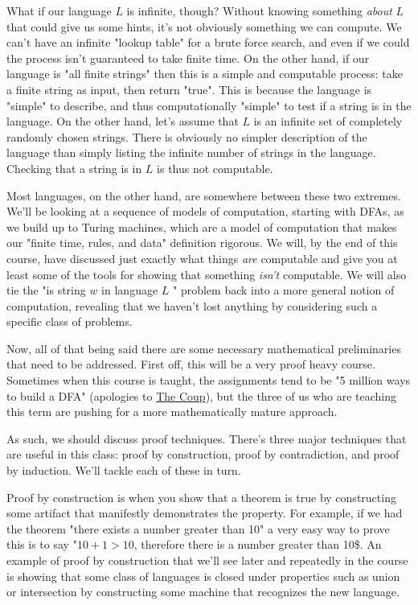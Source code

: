 \documentclass[11pt]{article}
\begin{document}
What if our language $L$ is infinite, though? Without knowing something \emph{about} $L$ that could give us some hints, it's not obviously something we can compute. We can't have an infinite "lookup table" for a brute force search, and even if we could the process isn't guaranteed to take finite time. On the other hand, if our language is "all finite strings" then this is a simple and computable process: take a finite string as input, then return "true". This is because the language is "simple" to describe, and thus computationally "simple" to test if a string is in the language. On the other hand, let's assume that $L$ is an infinite set of completely randomly chosen strings. There is obviously no simpler description of the language than simply listing the infinite number of strings in the language. Checking that a string is in $L$ is thus not computable.

Most languages, on the other hand, are somewhere between these two extremes. We'll be looking at a sequence of models of computation, starting with DFAs, as we build up to Turing machines, which are a model of computation that makes our "finite time, rules, and data" definition rigorous. We will, by the end of this course, have discussed just exactly what things \emph{are} computable and give you at least some of the tools for showing that something \emph{isn't} computable. We will also tie the "is string $w$ in language $L$ " problem back into a more general notion of computation, revealing that we haven't lost anything by considering such a specific class of problems.

Now, all of that being said there are some necessary mathematical preliminaries that need to be addressed. First off, this will be a very proof heavy course. Sometimes when this course is taught, the assignments tend to be "5 million ways to build a DFA" (apologies to \href{https://www.youtube.com/watch?v=RQthFDpYCys}{The Coup}), but the three of us who are teaching this term are pushing for a more mathematically mature approach. 

As such, we should discuss proof techniques. There's three major techniques that are useful in this class: proof by construction, proof by contradiction, and proof by induction. We'll tackle each of these in turn. 

Proof by construction is when you show that a theorem is true by constructing some artifact that manifestly demonstrates the property. For example, if we had the theorem "there exists a number greater than 10" a very easy way to prove this is to say "$10+1 > 10$, therefore there is a number greater than 10\$. An example of proof by construction that we'll see later and repeatedly in the course is showing that some class of languages is closed under properties such as union or intersection by constructing some machine that recognizes the new language.
\end{document}
